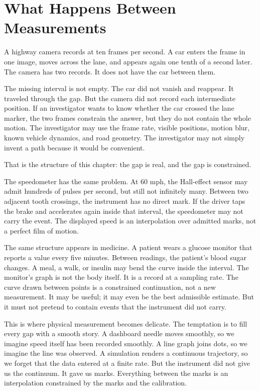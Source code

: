 \chapter{What Happens Between Measurements}
\label{chap:what-happens-between-measurements}


\begin{chapteressay}

A highway camera records at ten frames per second. A car enters the frame in
one image, moves across the lane, and appears again one tenth of a second later.
The camera has two records. It does not have the car between them.

The missing interval is not empty. The car did not vanish and reappear. It
traveled through the gap. But the camera did not record each intermediate
position. If an investigator wants to know whether the car crossed the lane
marker, the two frames constrain the answer, but they do not contain the whole
motion. The investigator may use the frame rate, visible positions, motion blur,
known vehicle dynamics, and road geometry. The investigator may not simply
invent a path because it would be convenient.

That is the structure of this chapter: the gap is real, and the gap is
constrained.

The speedometer has the same problem. At 60 mph, the Hall-effect sensor may
admit hundreds of pulses per second, but still not infinitely many. Between two
adjacent tooth crossings, the instrument has no direct mark. If the driver taps
the brake and accelerates again inside that interval, the speedometer may not
carry the event. The displayed speed is an interpolation over admitted marks,
not a perfect film of motion.

The same structure appears in medicine. A patient wears a glucose monitor that
reports a value every five minutes. Between readings, the patient's blood sugar
changes. A meal, a walk, or insulin may bend the curve inside the interval. The
monitor's graph is not the body itself. It is a record at a sampling rate. The
curve drawn between points is a constrained continuation, not a new
measurement. It may be useful; it may even be the best admissible estimate. But
it must not pretend to contain events that the instrument did not carry.

This is where physical measurement becomes delicate. The temptation is to fill
every gap with a smooth story. A dashboard needle moves smoothly, so we imagine
speed itself has been recorded smoothly. A line graph joins dots, so we imagine
the line was observed. A simulation renders a continuous trajectory, so we
forget that the data entered at a finite rate. But the instrument did not give
us the continuum. It gave us marks. Everything between the marks is an
interpolation constrained by the marks and the calibration.


\end{chapteressay}
